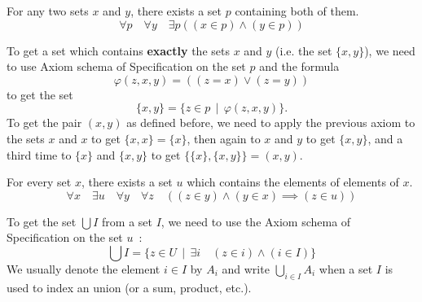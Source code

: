 \begin{axiom} \label{axiom-of-pairing}
    For any two sets $x$ and $y$, there exists a set $p$ containing both of them.
    \[
        \forall p \quad \forall y \quad \exists p ( (x \in p) \land (y \in p) )
    \]
\end{axiom}

\begin{remark}
    To get a set which contains \textbf{exactly} the sets $x$ and $y$ (i.e. the set $\{x,y\}$), we need to use Axiom schema of Specification on the set $p$ and the formula 
    \[
        \varphi(z,x,y) = ((z = x) \vee (z = y))
    \]
    to get the set
    \[
        \{x,y\} = \{ z \in p \, \mid \, \varphi(z,x,y) \}.    
    \]
    To get the pair $(x,y)$ as defined before, we need to apply the previous axiom to the sets $x$ and $x$ to get $\{x,x\} = \{x\}$, then again to $x$ and $y$ to get $\{x,y\}$, and a third time to $\{x\}$ and $\{x,y\}$ to get $\{\{x\}, \{x,y\}\} = (x,y)$.
\end{remark}

\begin{axiom}
    For every set $x$, there exists a set $u$ which contains the elements of elements of $x$. 
    \[
        \forall x \quad \exists u \quad \forall y \quad \forall z \quad ( (z \in y) \land (y \in x) \implies (z \in u) )
    \]
\end{axiom}

\begin{remark}
    To get the set $\bigcup I$ from a set $I$, we need to use the Axiom schema of Specification on the set $u$~:
    \[
        \bigcup I = \{ z \in U \, \mid \, \exists i \quad (z \in i) \land (i \in I) \}    
    \]
    We usually denote the element $i \in I$ by $A_i$ and write $\bigcup_{i \in I} A_i$ when a set $I$ is used to index an union (or a sum, product, etc.).
\end{remark}

